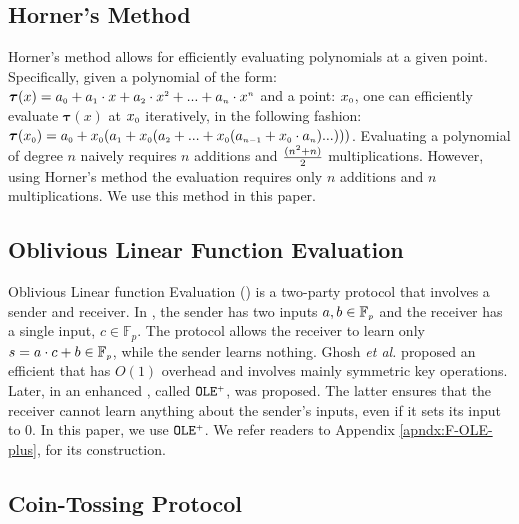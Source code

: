 \vs


\subsection{Horner's Method}
\svs

Horner's method \cite{DBLP:journals/ibmrd/Dorn62} allows for efficiently evaluating polynomials at a given point. Specifically, given a polynomial of the form: $\bm\tau(x)= a_{\scriptscriptstyle 0}+a_{\scriptscriptstyle 1}\cdot x+a_{\scriptscriptstyle 2}\cdot x^{\scriptscriptstyle 2}+...+a_{\scriptscriptstyle n}\cdot x^{\scriptscriptstyle n}$ and a point: $x_{\scriptscriptstyle 0}$, one can efficiently evaluate $\bm\tau(x)$ at $x_{\scriptscriptstyle 0}$ iteratively, in the following fashion: $\bm\tau(x_{\scriptscriptstyle 0})=a_{\scriptscriptstyle 0}+x_{\scriptscriptstyle 0}(a_{\scriptscriptstyle 1} + x_{\scriptscriptstyle 0}(a_{\scriptscriptstyle 2}+...+x_{\scriptscriptstyle 0}(a_{\scriptscriptstyle n-1}+x_{\scriptscriptstyle 0}\cdot a_{\scriptscriptstyle n})...)))$. Evaluating  a polynomial of degree $n$ naively requires  $n$ additions and $\frac{(n^{\scriptscriptstyle 2}+n)}{2}$ multiplications. However, using Horner's method the evaluation requires only $n$ additions and $n$ multiplications. We use this method in this paper. 

\vs


\subsection{Oblivious Linear Function Evaluation}\label{sec::OLE-plus}

Oblivious Linear function Evaluation (\ole) is a two-party protocol that involves a sender and receiver. In \ole,  the sender  has two  inputs  $a, b\in \mathbb{F}_{\scriptscriptstyle p}$ and the receiver has a single input, $c \in \mathbb{F}_{p}$.  The protocol allows the receiver to learn only $s = a\cdot c + b \in \mathbb{F}_{\scriptscriptstyle p}$, while the sender learns nothing. Ghosh \textit{et al.} \cite{GhoshNN17} proposed an efficient \ole that has $O(1)$ overhead and involves mainly symmetric key operations. Later, in \cite{GhoshN19} an enhanced \ole, called $\mathtt{OLE}^{\scriptscriptstyle +}$, was proposed. The latter ensures that the receiver cannot learn anything about the sender's inputs,  even if it sets its input to $0$. In this paper, we use $\mathtt{OLE}^{\scriptscriptstyle +}$. We refer readers to Appendix \ref{apndx:F-OLE-plus}, for its construction.  %


\vs

\subsection{Coin-Tossing Protocol}

